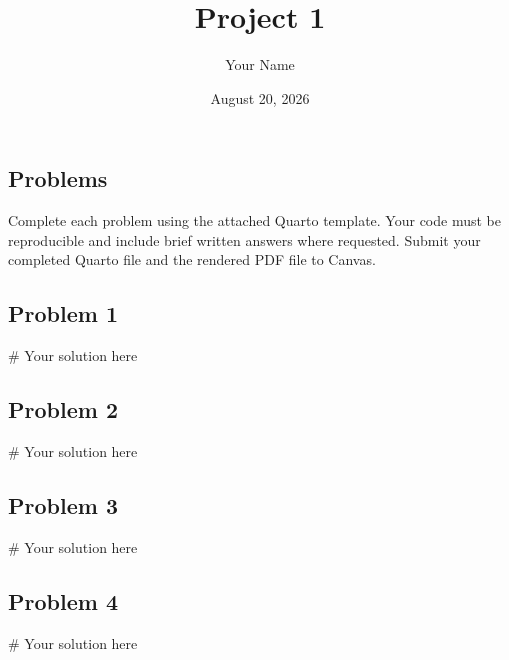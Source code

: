 \documentclass[
  letterpaper,
  DIV=11,
  numbers=noendperiod]{scrartcl}
\title{Project 1}
\author{Your Name}
\date{August 20, 2026}
\newenvironment{Shaded}{\begin{snugshade}}{\end{snugshade}}
\newcommand{\CommentTok}[1]{\textcolor[rgb]{0.37,0.37,0.37}{#1}}
\begin{document}
\maketitle


\subsection{Problems}\label{problems}

Complete each problem using the attached Quarto template. Your code must
be reproducible and include brief written answers where requested.
Submit your completed Quarto file and the rendered PDF file to Canvas.

\subsection{Problem 1}\label{problem-1}

\begin{Shaded}
\begin{Highlighting}[]
\CommentTok{\# Your solution here}
\end{Highlighting}
\end{Shaded}

\subsection{Problem 2}\label{problem-2}

\begin{Shaded}
\begin{Highlighting}[]
\CommentTok{\# Your solution here}
\end{Highlighting}
\end{Shaded}

\subsection{Problem 3}\label{problem-3}

\begin{Shaded}
\begin{Highlighting}[]
\CommentTok{\# Your solution here}
\end{Highlighting}
\end{Shaded}

\subsection{Problem 4}\label{problem-4}

\begin{Shaded}
\begin{Highlighting}[]
\CommentTok{\# Your solution here}
\end{Highlighting}
\end{Shaded}
\end{document}
